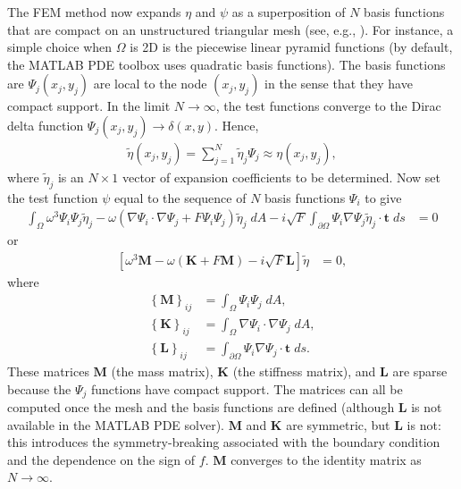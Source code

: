 \documentclass[10pt,reqno]{amsart}
\newcommand{\K}{{\mathbf K}}
\newcommand{\M}{{\mathbf M}}
\newcommand{\LL}{{\mathbf L}}
\newcommand{\ttt}{{\mathbf t}}
\begin{document}
The FEM method now expands $\eta$ and $\psi$ as a superposition of $N$ basis functions that are compact on an unstructured triangular mesh (see, e.g., \citealt{zwillinger98}).
For instance, a simple choice when $\Omega$ is 2D is the piecewise linear pyramid functions (by default, the MATLAB PDE toolbox uses quadratic basis functions).
The basis functions are $\Psi_j (x_j,y_j)$ are local to the node $(x_j, y_j)$ in the sense that they have compact support. 
In the limit $N \rightarrow \infty$, the test functions converge to the Dirac delta function $\Psi_j (x_j, y_j) \rightarrow \delta(x, y)$.
Hence, 
\begin{align}
\tilde{\eta} (x_j, y_j) = \sum_{j=1}^N \tilde{\eta}_j \Psi_j \approx \eta (x_j, y_j) , 
\end{align}
where $\tilde{\eta}_j$ is an $N \times 1$ vector of expansion coefficients to be determined.
Now set the test function $\psi$ equal to the sequence of $N$ basis functions $\Psi_i$ to give
\begin{align}
\int_\Omega \omega^3 \Psi_i \Psi_j \tilde{\eta}_j  - \omega \left( \nabla \Psi_i \cdot   \nabla \Psi_j  +  F \Psi_i \Psi_j \right) \tilde{\eta}_j \; d A - i \sqrt{F} \int_ {\partial \Omega}  \Psi_i \nabla \Psi_j \tilde{\eta}_j \cdot \ttt \; d s & = 0 
\label{eqn:FEM_problem}
\end{align}
or
\begin{align}
\left[ \omega^3 \M - \omega \left( \K  +  F \M \right) - i \sqrt{F} \LL \right] \tilde{\eta} & = 0  ,
\label{eqn:hat_eta_problem}
\end{align}
where
\begin{align}
\left\{ \M \right\}_{i j}  &= \int_\Omega   \Psi_i \Psi_j \; dA , \\
\left\{ \K \right\}_{i j} &= \int_\Omega   \nabla \Psi_i \cdot   \nabla \Psi_j \; dA , \\
\left\{ \LL \right\}_{i j} & =  \int_ {\partial \Omega}  \Psi_i \nabla \Psi_j \cdot \ttt \; d s .
\end{align}
These matrices $\M$ (the mass matrix), $\K$ (the stiffness matrix), and $\LL$ are sparse because the $\Psi_j$ functions have compact support.
The matrices can all be computed once the mesh and the basis functions are defined (although $\LL$ is not available in the MATLAB PDE solver).
$\M$ and $\K$ are symmetric, but $\LL$ is not: this introduces the symmetry-breaking associated with the boundary condition and the dependence on the sign of $f$. 
$\M$ converges to the identity matrix as $N \rightarrow \infty$.
\end{document}
